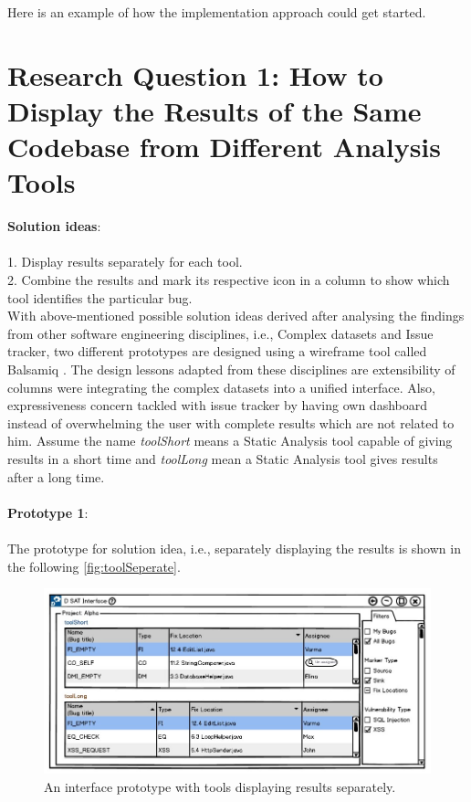 Here is an example of how the implementation approach could get started.

\section{Research Question 1: How to Display the Results of the Same Codebase from Different Analysis Tools}

\textbf{Solution ideas}: \\ \\
1. Display results separately for each tool. \\
2. Combine the results and mark its respective icon in a column to show which tool identifies the particular bug. \\

With above-mentioned possible solution ideas derived after analysing the findings from other software engineering disciplines, i.e., Complex datasets and Issue tracker, two different prototypes are designed using a wireframe tool called Balsamiq \cite{B}. The design lessons adapted from these disciplines are extensibility of columns were integrating the complex datasets into a unified interface. Also, expressiveness concern tackled with issue tracker by having own dashboard instead of overwhelming the user with complete results which are not related to him. Assume the name \textit{toolShort} means a Static Analysis tool capable of giving results in a short time and \textit{toolLong} mean a Static Analysis tool gives results after a long time. \\ \\

\textbf{Prototype 1}: \\ \\

The prototype for solution idea, i.e., separately displaying the results is shown in the following \autoref{fig:toolSeperate}. \\ 

\begin{figure}[hbt!]
	\centering
	\includegraphics[width=\linewidth]{figures/d_seperate}
	\caption{An interface prototype with tools displaying results separately.}
	\label{fig:toolSeperate}
\end{figure}

